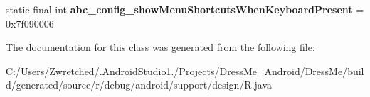 \begin{DoxyCompactItemize}
\item 
\hypertarget{classandroid_1_1support_1_1design_1_1_r_1_1bool_a4042d6c58489ca07bb71f1b08b2e75bc}{}static final int {\bfseries abc\+\_\+config\+\_\+show\+Menu\+Shortcuts\+When\+Keyboard\+Present} = 0x7f090006\label{classandroid_1_1support_1_1design_1_1_r_1_1bool_a4042d6c58489ca07bb71f1b08b2e75bc}

\end{DoxyCompactItemize}


The documentation for this class was generated from the following file\+:\begin{DoxyCompactItemize}
\item 
C\+:/\+Users/\+Zwretched/.\+Android\+Studio1./\+Projects/\+Dress\+Me\+\_\+\+Android/\+Dress\+Me/build/generated/source/r/debug/android/support/design/R.\+java\end{DoxyCompactItemize}
